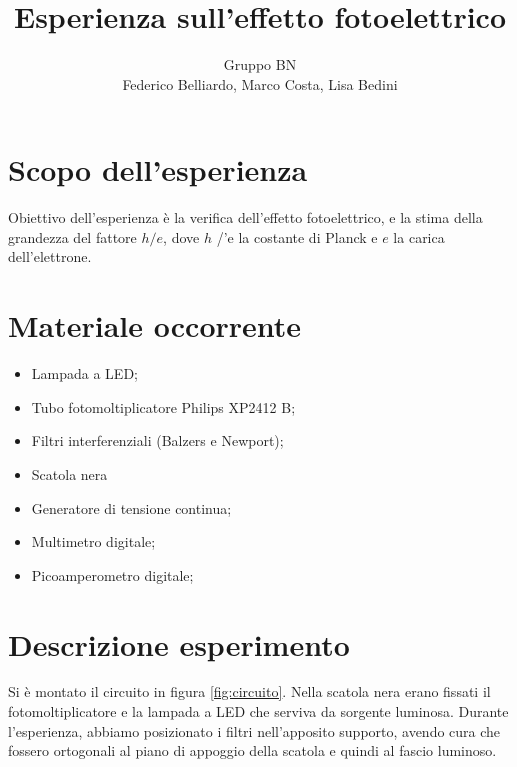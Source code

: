 \documentclass[10pt,a4paper]{article}
\author{Gruppo BN \\ Federico Belliardo, Marco Costa, Lisa Bedini}
\title{Esperienza sull'effetto fotoelettrico}
\begin{document}
\maketitle
\section{Scopo dell'esperienza}
Obiettivo dell'esperienza è la verifica dell'effetto fotoelettrico, e la stima della grandezza del fattore $h/e$, dove $h$ /'e la costante di Planck e $e$ la carica dell'elettrone.\\
\section{Materiale occorrente}
\begin{itemize}
\item Lampada a LED;
\item Tubo fotomoltiplicatore Philips XP2412 B;
\item Filtri interferenziali (Balzers e Newport);
\item Scatola nera
\item Generatore di tensione continua;
\item Multimetro digitale;
\item Picoamperometro digitale;
\end{itemize}
\section{Descrizione esperimento}

Si è montato il circuito in figura \ref{fig:circuito}. Nella scatola nera erano fissati il fotomoltiplicatore e la lampada a LED che serviva da sorgente luminosa. Durante l'esperienza, abbiamo posizionato i filtri nell'apposito supporto, avendo cura che fossero ortogonali al piano di appoggio della scatola e quindi al fascio luminoso.
\end{document}
